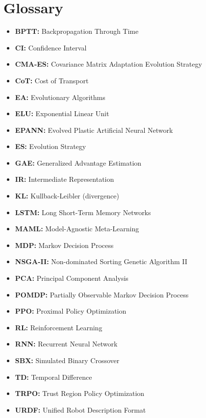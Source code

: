 \chapter*{Glossary}
\begin{itemize}
    \item \textbf{BPTT:} Backpropagation Through Time
    \item \textbf{CI:} Confidence Interval
    \item \textbf{CMA-ES:} Covariance Matrix Adaptation Evolution Strategy
    \item \textbf{CoT:} Cost of Transport
    \item \textbf{EA:} Evolutionary Algorithms
    \item \textbf{ELU:} Exponential Linear Unit
    \item \textbf{EPANN:} Evolved Plastic Artificial Neural Network
    \item \textbf{ES:} Evolution Strategy
    \item \textbf{GAE:} Generalized Advantage Estimation
    \item \textbf{IR:} Intermediate Representation
    \item \textbf{KL:} Kullback-Leibler (divergence)
    \item \textbf{LSTM:} Long Short-Term Memory Networks
    \item \textbf{MAML:} Model-Agnostic Meta-Learning
    \item \textbf{MDP:} Markov Decision Process
    \item \textbf{NSGA-II:} Non-dominated Sorting Genetic Algorithm II
    \item \textbf{PCA:} Principal Component Analysis
    \item \textbf{POMDP:} Partially Observable Markov Decision Process
    \item \textbf{PPO:} Proximal Policy Optimization
    \item \textbf{RL:} Reinforcement Learning
    \item \textbf{RNN:} Recurrent Neural Network
    \item \textbf{SBX:} Simulated Binary Crossover
    \item \textbf{TD:} Temporal Difference
    \item \textbf{TRPO:} Trust Region Policy Optimization
    \item \textbf{URDF:} Unified Robot Description Format
\end{itemize}